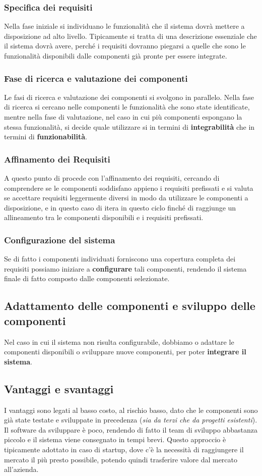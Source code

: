 \subsubsection{Specifica dei requisiti}
Nella fase iniziale si individuano le funzionalità che il sistema dovrà mettere a disposizione
ad alto livello. Tipicamente si tratta di una descrizione essenziale che il sistema dovrà avere,
perché i requisiti dovranno piegarsi a quelle che sono le funzionalità disponibili dalle 
componenti già pronte per essere integrate.
\subsubsection{Fase di ricerca e valutazione dei componenti}
Le fasi di ricerca e valutazione dei componenti si svolgono in parallelo.
Nella fase di ricerca si cercano nelle componenti le funzionalità che 
sono state identificate, mentre nella fase di valutazione, nel caso in cui più componenti 
espongano la stessa funzionalità, si decide quale utilizzare si in termini di \textbf{integrabilità}
che in termini di \textbf{funzionabilità}.
\subsubsection{Affinamento dei Requisiti}
A questo punto di procede con l'affinamento dei requisiti, cercando di comprendere se 
le componenti soddisfano appieno i requisiti prefissati e si valuta se accettare 
requisiti leggermente diversi in modo da utilizzare le componenti a disposizione, 
e in questo caso di itera in questo ciclo finché di raggiunge un allineamento tra le componenti 
disponibili e i requisiti prefissati.
\subsubsection{Configurazione del sistema}
Se di fatto i componenti individuati forniscono una copertura completa dei requisiti possiamo 
iniziare a \textbf{configurare} tali componenti, rendendo il sistema finale di fatto 
composto dalle componenti selezionate. 
\subsection{Adattamento delle componenti e sviluppo delle componenti}
Nel caso in cui il sistema non risulta configurabile, dobbiamo o adattare le componenti 
disponibili o sviluppare nuove componenti, per poter \textbf{integrare il sistema}. 
\subsection{Vantaggi e svantaggi}
I vantaggi sono legati al basso costo, al rischio basso, dato che le componenti sono 
già state testate e sviluppate in precedenza (\textit{sia da terzi che da progetti esistenti}).
Il software da sviluppare è poco, rendendo di fatto il team di sviluppo abbastanza piccolo e 
il sistema viene consegnato in tempi brevi. Questo approccio è tipicamente adottato in caso di 
startup, dove c'è la necessità di raggiungere il mercato il più presto possibile, potendo quindi 
trasferire valore dal mercato all'azienda.

